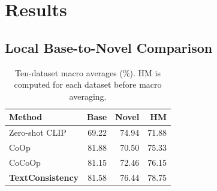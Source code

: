 \documentclass[preprint,12pt]{elsarticle}
\begin{document}
\section{Results}
\label{sec:results}

\subsection{Local Base-to-Novel Comparison}

\begin{table}[t]
\centering
\caption{Locally evaluated harmonic-mean accuracy (\%) on ten base-to-novel benchmarks. All methods use CLIP ViT-B/16 and the official class splits. CoOp, CoCoOp, and TextConsistency are averaged over three seeds.}
\label{tab:local_hm}
\scriptsize
\setlength{\tabcolsep}{3.2pt}
\end{table}
\begin{table}[t]
\centering
\caption{Ten-dataset macro averages (\%). HM is computed for each dataset before macro averaging.}
\label{tab:average_metrics}
\small
\begin{tabular}{lrrr}
\toprule
Method & Base & Novel & HM \\
\midrule
Zero-shot CLIP & 69.22 & 74.94 & 71.88 \\
CoOp & 81.88 & 70.50 & 75.33 \\
CoCoOp & 81.15 & 72.46 & 76.15 \\
\textbf{TextConsistency} & 81.58 & 76.44 & 78.75 \\
\bottomrule
\end{tabular}
\end{table}
\end{document}
